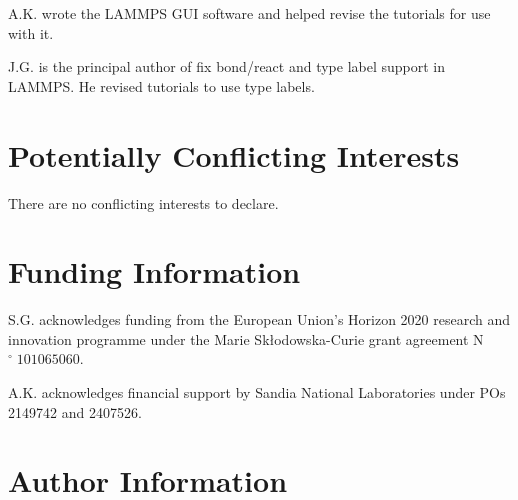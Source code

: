 \documentclass[9pt,tutorial]{livecoms}
\begin{document}
\noindent A.K. wrote the LAMMPS GUI software and helped revise the
tutorials for use with it.

\noindent J.G. is the principal author of fix bond/react and type label
support in LAMMPS.  He revised tutorials to use type labels.

\section*{Potentially Conflicting Interests}

There are no conflicting interests to declare.

\section*{Funding Information}

S.G. acknowledges funding from the European Union's Horizon 2020 research and
innovation programme under the Marie Skłodowska-Curie grant agreement N$^\circ\;101065060$.

\noindent A.K. acknowledges financial support by Sandia National Laboratories under
POs 2149742 and 2407526.

\section*{Author Information}
\makeorcid



\end{document}
